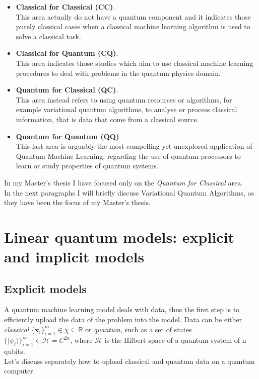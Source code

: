 \begin{itemize}
    \item \textbf{Classical for Classical (CC)}.\\ This area actually do not have a quantum component and 
    it indicates those purely classical cases when a classical machine learning algorithm is used to solve 
    a classical task.
    \item \textbf{Classical for Quantum (CQ)}.\\ This area indicates those studies which aim to use classical
    machine learning procedures to deal with problems in the quantum physics domain.
    \item \textbf{Quantum for Classical (QC)}.\\ This area instead refers to using quantum resources or algorithms, 
    for example variational quantum algorithms, to analyse or process classical information, 
    that is data that come from a classical source.
    \item \textbf{Quantum for Quantum (QQ)}.\\ This last area is arguably the most compelling yet unexplored
    application of Quantum Machine Learning, regarding the use of quantum processors to
    learn or study properties of quantum systems.
\end{itemize}

In my Master's thesis I have focused only on the \textit{Quantum for Classical} area.\\


In the next paragraphs I will briefly discuss Variational Quantum Algorithms, as they have been the focus
of my Master's thesis.


\section{Linear quantum models: explicit and implicit models}


\subsection{Explicit models}

A quantum machine learning model deals with data, thus the first step is to efficiently upload the data of the 
problem into the model.
Data can be either \textit{classical} $\{\bm{x}_i\}_{i=1}^m \in \chi \subseteq \mathbb{R}$ 
or \textit{quantum}, such as a set of states $\{ |\psi_i\rangle \}_{i=1}^m \in \mathcal{H} = C^{2n}$, 
where $\mathcal{H}$ is the Hilbert space of a quantum system of n qubits.\\
Let's discuss separately how to upload classical and quantum data on a quantum computer.


